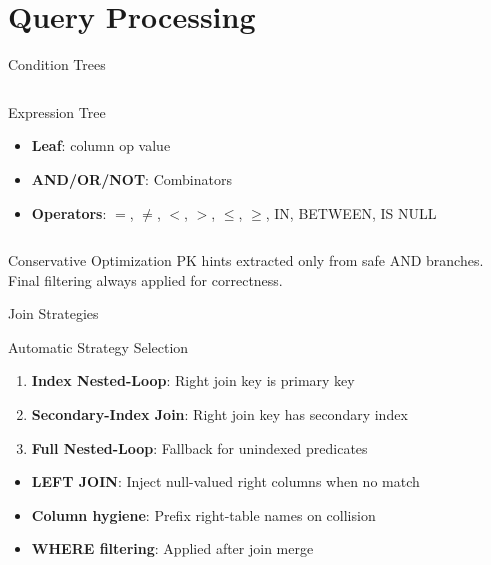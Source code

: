 \documentclass[aspectratio=169]{beamer}
\begin{document}
\section{Query Processing}

\begin{frame}{Condition Trees}
\begin{columns}
\begin{block}{Expression Tree}
\begin{itemize}
  \item \textbf{Leaf}: column op value
  \item \textbf{AND/OR/NOT}: Combinators
  \item \textbf{Operators}: $=$, $\neq$, $<$, $>$, $\leq$, $\geq$, IN, BETWEEN, IS NULL
\end{itemize}
\end{block}

\begin{center}
\end{center}
\end{columns}

\vspace{0.5cm}
\begin{alertblock}{Conservative Optimization}
PK hints extracted only from safe AND branches. Final filtering always applied for correctness.
\end{alertblock}
\end{frame}

\begin{frame}{Join Strategies}
\begin{block}{Automatic Strategy Selection}
\begin{enumerate}
  \item \textbf{Index Nested-Loop}: Right join key is primary key
  \item \textbf{Secondary-Index Join}: Right join key has secondary index
  \item \textbf{Full Nested-Loop}: Fallback for unindexed predicates
\end{enumerate}
\end{block}

\begin{itemize}
  \item \textbf{LEFT JOIN}: Inject null-valued right columns when no match
  \item \textbf{Column hygiene}: Prefix right-table names on collision
  \item \textbf{WHERE filtering}: Applied after join merge
\end{itemize}
\end{frame}
\end{document}

